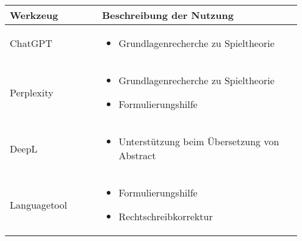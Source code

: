 \begin{table}[hbt]	
	\centering
	\renewcommand{\arraystretch}{1.5}	%
	\label{tab:anhang_uebersicht_KI_werkzeuge}
	\begin{tabular}{>{\raggedright\arraybackslash}p{0.3\linewidth} >{\raggedright\arraybackslash}p{0.65\linewidth}}
		\textbf{Werkzeug} & \textbf{Beschreibung der Nutzung}\\
		\hline 
		\hline
		ChatGPT & 	\vspace{-\topsep}
		\begin{itemize}[noitemsep,topsep=0pt,partopsep=0pt,parsep=0pt] 
			\item Grundlagenrecherche zu Spieltheorie 
			
		\end{itemize} \\
		Perplexity &	\vspace{-\topsep}
		\begin{itemize}[noitemsep,topsep=0pt,partopsep=0pt,parsep=0pt] 
			\item Grundlagenrecherche zu Spieltheorie 
			\item Formulierungshilfe
		\end{itemize} \\ 
		DeepL	&	\vspace{-\topsep}
		\begin{itemize}[noitemsep,topsep=0pt,partopsep=0pt,parsep=0pt] 
			\item Unterstützung beim Übersetzung von Abstract
		\end{itemize} \\ 
		Languagetool &	\vspace{-\topsep}
		\begin{itemize}[noitemsep,topsep=0pt,partopsep=0pt,parsep=0pt] 
			\item Formulierungshilfe 
			\item Rechtschreibkorrektur 
		\end{itemize} \\ 
		
		
		\hline 
	\end{tabular} 
\end{table}
\clearpage
